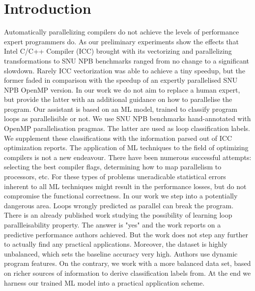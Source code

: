 \documentclass{acaces}
\begin{document}
\section{Introduction}
\quad Automatically parallelizing compilers do not achieve the levels of performance expert programmers do. As our preliminary experiments show the effects that Intel C/C++ Compiler (ICC) brought with its vectorizing and parallelizing transformations to SNU NPB benchmarks ranged from no change to a significant slowdown. Rarely ICC vectorization was able to achieve a tiny speedup, but the former faded in comparison with the speedup of an expertly parallelised SNU NPB OpenMP version. In our work we do not aim to replace a human expert, but provide the latter with an additional guidance on how to parallelise the program.\newline\null
\quad Our assistant is based on an ML model, trained to classify program loops as parallelisible or not. We use SNU NPB benchmarks hand-annotated with OpenMP parallelisation pragmas. The latter are used as loop classification labels. We supplement these classifications with the information parsed out of ICC optimization reports.\newline\null
\quad The application of ML techniques to the field of optimizing compilers is not a new endeavour. There have been numerous successful attempts: selecting the best compiler flags, determining how to map parallelism to processors, etc. For these types of problems uneradicable statistical errors inherent to all ML techniques might result in the performance losses, but do not compromise the functional correctness. In our work we step into a potentially dangerous area. Loops wrongly predicted as parallel can break the program. There is an already published work \cite{fried_ea:2013:icmla} studying the possibility of learning loop parallleisability property. The answer is "yes" and the work reports on a predictive performance authors achieved. But the work does not step any further to actually find any practical applications. Moreover, the dataset is highly unbalanced, which sets the baseline accuracy very high. Authors use dynamic program features.\newline\null
\quad On the contrary, we work with a more balanced data set, based on richer sources of information to derive classification labels from. At the end we harness our trained ML model into a practical application scheme.
\end{document}

